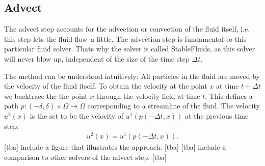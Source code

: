 \documentclass[a4paper,10pt,oneside,final,german,openbib,pdftex,titlepage]{scrbook}
\begin{document}
\subsection{Advect}
The advect step accounts for the advection or convection of the fluid itself, i.e. this step lets the fluid \glqq flow\grqq ~a little.
The advection step is fundamental to this particular fluid solver. Thats why the solver is called \glqq Stable\grqq Fluids, as this solver will never blow up, independent of the size of the time step $\Delta t$. 

The method can be understood intuitively: All particles in the fluid are moved by the velocity of the fluid itself. To obtain the velocity at the point $x$ at time $t + \Delta t$ we backtrace the the point $x$ through the velocity field at time $t$. This defines a path $p: (-\delta,\delta) \times \Omega \rightarrow \Omega$ corresponding to a streamline of the fluid. The velocity $u^2(x)$ is the set to be the velocity of $u^1(p(-\Delta t,x))$ at the previous time step:
\begin{align*}
	u^2(x) = u^1(p(-\Delta t,x)).
\end{align*}
[tba] include a figure that illustrates the approach. [tba]
[tba] include a comparison to other solvers of the advect step. [tba]
\end{document}
